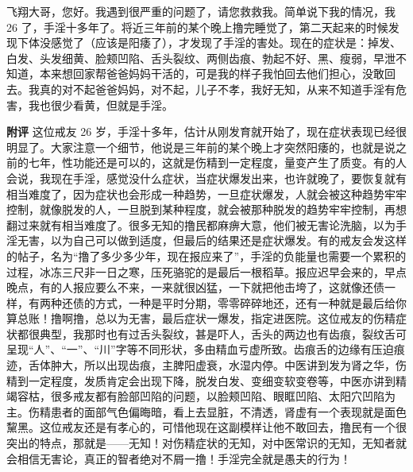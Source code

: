 \begin{case}
    飞翔大哥，您好。我遇到很严重的问题了，请您救救我。简单说下我的情况，我 26 了，手淫十多年了。将近三年前的某个晚上撸完睡觉了，第二天起来的时候发现下体没感觉了（应该是阳痿了），才发现了手淫的害处。现在的症状是：掉发、白发、头发细黄、脸颊凹陷、舌头裂纹、两侧齿痕、勃起不好、黑、瘦弱，早泄不知道，本来想回家帮爸爸妈妈干活的，可是我的样子我怕回去他们担心，没敢回去。我真的对不起爸爸妈妈，对不起，儿子不孝，我好无知，从来不知道手淫有危害，我也很少看黄，但就是手淫。

    \textbf{附评} 这位戒友 26 岁，手淫十多年，估计从刚发育就开始了，现在症状表现已经很明显了。大家注意一个细节，他说是三年前的某个晚上才突然阳痿的，也就是说之前的七年，性功能还是可以的，这就是伤精到一定程度，量变产生了质变。有的人会说，我现在手淫，感觉没什么症状，当症状爆发出来，也许就晚了，要恢复就有相当难度了，因为症状也会形成一种趋势，一旦症状爆发，人就会被这种趋势牢牢控制，就像脱发的人，一旦脱到某种程度，就会被那种脱发的趋势牢牢控制，再想翻过来就有相当难度了。很多无知的撸民都麻痹大意，他们被无害论洗脑，以为手淫无害，以为自己可以做到适度，但最后的结果还是症状爆发。有的戒友会发这样的帖子，名为“撸了多少多少年，现在报应来了”，手淫的负能量也需要一个累积的过程，冰冻三尺非一日之寒，压死骆驼的是最后一根稻草。报应迟早会来的，早点晚点，有的人报应要么不来，一来就很凶猛，一下就把他击垮了，这就像还债一样，有两种还债的方式，一种是平时分期，零零碎碎地还，还有一种就是最后给你算总账！撸啊撸，总以为无害，最后症状一爆发，指定进医院。这位戒友的伤精症状都很典型，我那时也有过舌头裂纹，甚是吓人，舌头的两边也有齿痕，裂纹舌可呈现“人”、“一”、“川”字等不同形状，多由精血亏虚所致。齿痕舌的边缘有压迫痕迹，舌体肿大，所以出现齿痕，主脾阳虚衰，水湿内停。中医讲到发为肾之华，伤精到一定程度，发质肯定会出现下降，脱发白发、变细变软变卷等，中医亦讲到精竭容枯，很多戒友都有脸部凹陷的问题，以脸颊凹陷、眼眶凹陷、太阳穴凹陷为主。伤精患者的面部气色偏晦暗，看上去显脏，不清透，肾虚有一个表现就是面色黧黑。这位戒友还是有孝心的，可惜他现在这副模样让他不敢回去，撸民有一个很突出的特点，那就是——无知！对伤精症状的无知，对中医常识的无知，无知者就会相信无害论，真正的智者绝对不屑一撸！手淫完全就是愚夫的行为！
\end{case}

